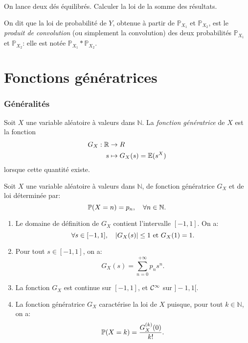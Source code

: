 \begin{exemple}
	On lance deux dés équilibrés. Calculer la loi de la somme des résultats.
	\pl{\rep{3cm}}
\end{exemple}

\begin{definition}
	On dit que la loi de probabilité de $Y$, obtenue à partir de $\mathbb{P}_{X_1}$ et $\mathbb{P}_{X_2}$, est le \emph{produit de convolution} (ou simplement la convolution) des deux probabilités $\mathbb{P}_{X_1}$ et $\mathbb{P}_{X_2}$: elle est notée $\mathbb{P}_{X_1} \ast \mathbb{P}_{X_2}$.
\end{definition}


\sld{\vfill\pagebreak[5]}%
\section{Fonctions génératrices}

\subsubsection{Généralités}

\begin{definition}
Soit $X$ une variable aléatoire à valeurs dans $\mathbb{N}$. La \emph{fonction génératrice} de $X$ est la fonction 
\begin{align*}
	G_X : \mathbb{R} &\to R \\
	s &\mapsto G_X(s) = \mathbb{E} (s^X)
\end{align*}
lorsque cette quantité existe. 
\end{definition}
\sld{\vfill\pagebreak[5]}%
\begin{proposition}
Soit $X$ une variable aléatoire à valeurs dans $\mathbb{N}$, de fonction génératrice $G_X$ et de loi déterminée par:
 \[ \redspace\mathbb{P} (X=n) = p_n, \quad \forall n \in \mathbb{N}. \]
\begin{enumerate}[label=$(\roman*)$]
 \item Le domaine de définition de $G_X$ contient l'intervalle $[-1,1]$. On a:
	 \[ \redspace\forall s \in [-1,1], \quad |G_X(s)| \leq 1 \textrm{ et } G_X(1)=1.  \]
 \item Pour tout $s \in [-1,1]$, on a:
  \[ G_X(s)=\sum_{n=0}^{+ \infty} p_n s^n.\]
 \item La fonction $G_X$ est continue sur $[-1,1]$, et $\mathcal{C}^{\infty}$ sur $]-1,1[$.
 \item La fonction génératrice $G_X$ caractérise la loi de $X$ puisque, pour tout $k \in \mathbb{N}$, on a:
  \[ \redspace\mathbb{P} (X=k) = \frac{G_X^{(k)} (0)}{k!}.\]
\end{enumerate}
\end{proposition}

